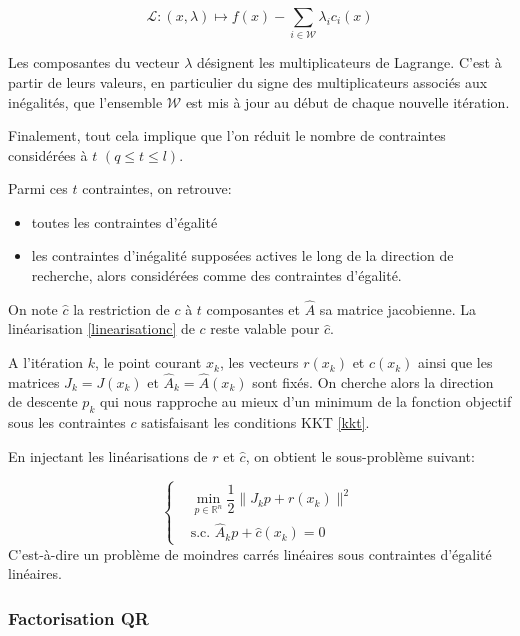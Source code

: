 \documentclass[a4paper,11pt]{article}
\newcommand{\real}{\mathbb{R}}
\newcommand{\ha}{\hat{A}}
\newcommand{\hc}{\hat{c}}
\numberwithin{equation}{section}
\begin{document}
\begin{equation} \label{lagrangien}
\mathcal{L}:(x,\lambda) \mapsto f(x) - \sum\limits_{i\in \mathcal{W}} \lambda_{i}c_{i}(x)
\end{equation}

Les composantes du vecteur $\lambda$ désignent les multiplicateurs de Lagrange. C'est à partir de leurs valeurs, en particulier du signe des multiplicateurs associés aux inégalités, que l'ensemble $\mathcal{W}$ est mis à jour au début de chaque nouvelle itération.

Finalement, tout cela implique que l'on réduit le nombre de contraintes considérées à $t$ $(q \leq t \leq l)$. 

Parmi ces $t$ contraintes, on retrouve:
\begin{itemize}
\item
toutes les contraintes d'égalité
\item
les contraintes d'inégalité supposées actives le long de la direction de recherche, alors considérées comme des contraintes d'égalité. 
\end{itemize}

On note $\hc$ la restriction de $c$ à $t$ composantes et $\ha$ sa matrice jacobienne. La linéarisation \eqref{linearisationc} de $c$ reste valable pour $\hc$.

A l'itération $k$,  le point courant $x_{k}$, les vecteurs $r(x_{k})$ et $\hc(x_{k})$ ainsi que les matrices $J_{k}=J(x_{k}) \text{ et } \ha_{k}=\ha(x_{k})$ sont fixés. On cherche alors la direction de descente $p_{k}$ qui nous rapproche au mieux d'un minimum  de la fonction objectif sous les contraintes $c$ satisfaisant les conditions KKT \eqref{kkt}. 

En injectant les linéarisations de $r$ et $\hc$, on obtient le sous-problème suivant:

\begin{equation} \label{souspb}
\left\{ \begin{aligned}
&\underset{p \in \real^{n}}{\min} \dfrac{1}{2}\|J_{k}p+r(x_{k})\|^{2} \\
&\text{s.c. }  \ha_{k}p+\hc(x_{k})=0
\end{aligned} \right.
\end{equation}
C'est-à-dire un problème de moindres carrés linéaires sous contraintes d'égalité linéaires.

\subsubsection{Factorisation QR} \label{factqr}
\end{document}
